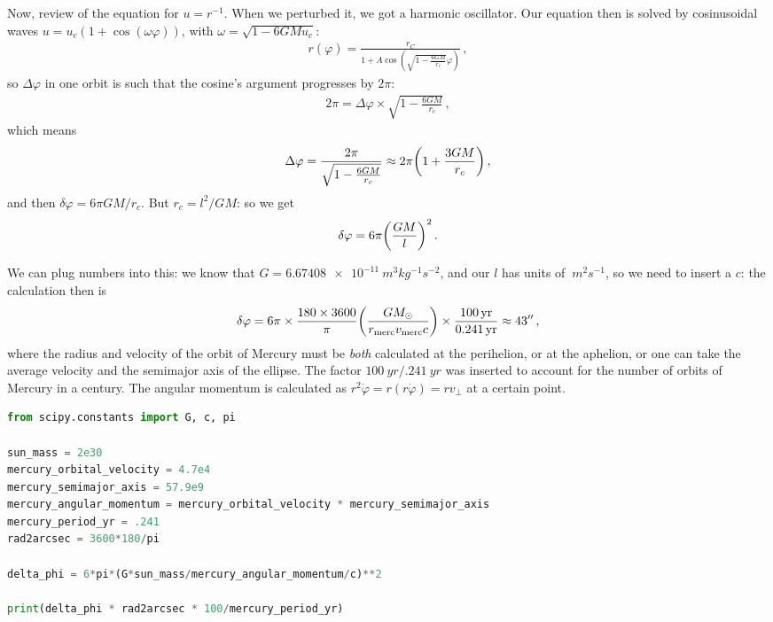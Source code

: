 \documentclass[main.tex]{subfiles}
\begin{document}
Now, review of the equation for \(u = r^{-1}\). When we perturbed it, we got a harmonic oscillator. Our equation then is solved by cosinusoidal waves \(u = u_c (1+\cos(\omega \varphi ))\), with \(\omega = \sqrt{1 - 6GMu_c}\): 
%
\begin{align}
  r(\varphi) = \frac{r_C}{1 + A \cos(\sqrt{1 - \frac{6GM}{r_c}}\varphi )}
\,,
\end{align}
%
so \(\Delta \varphi \) in one orbit is such that the cosine's argument progresses by \(2 \pi \):
%
\begin{align}
2 \pi = \Delta \varphi \times \sqrt{1 - \frac{6GM}{r_c}}
\,,
\end{align}
%
which means
%
\begin{align}
  \Delta \varphi = \frac{2 \pi}{\sqrt{1 - \frac{6GM}{r_c}}} 
  \approx
  2 \pi \qty(1 + \frac{3GM}{r_c})
\,,
\end{align}
%
and then \(\delta \varphi  = 6 \pi GM / r_c\). But \(r_c = l^2/ GM\): so we get 
%
\begin{align}
  \delta \varphi = 6 \pi \qty(\frac{GM}{l})^2
\,. 
\end{align}
%

We can plug numbers into this: we know that \(G = \SI{6.67408e-11}{m^3 kg^{-1} s^{-2}}\), and our \(l\) has units of \(\SI{}{m^2s^{-1}}\), so we need to insert a \(c\): the calculation then is 
%
\begin{align}
  \delta \varphi = 6 \pi \times \frac{180 \times 3600}{\pi }  \qty(\frac{G M_{\odot}}{r _{\text{merc}} v _{\text{merc}} c}) \times \frac{\SI{100}{yr}}{\SI{.241}{yr}} \approx 43''
\,,
\end{align}
%
where the radius and velocity of the orbit of Mercury must be \emph{both} calculated at the perihelion, or at the aphelion, or one can take the average velocity and the semimajor axis of the ellipse. 
The factor \(\SI{100}{yr} / \SI{.241}{yr}\) was inserted to account for the number of orbits of Mercury in a century.
The angular momentum is calculated as \(r^2 \dot{\varphi} = r (r \dot{\varphi}) = rv_{\perp}\) at a certain point.

\begin{lstlisting}[language=Python]
from scipy.constants import G, c, pi

sun_mass = 2e30
mercury_orbital_velocity = 4.7e4
mercury_semimajor_axis = 57.9e9
mercury_angular_momentum = mercury_orbital_velocity * mercury_semimajor_axis
mercury_period_yr = .241
rad2arcsec = 3600*180/pi

delta_phi = 6*pi*(G*sun_mass/mercury_angular_momentum/c)**2

print(delta_phi * rad2arcsec * 100/mercury_period_yr)
\end{lstlisting}
\end{document}
